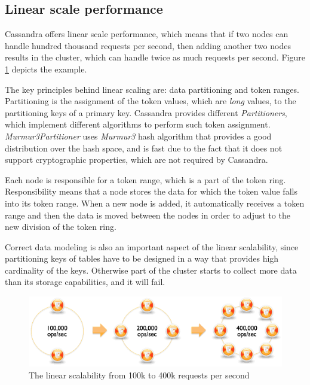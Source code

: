 
\subsection{Linear scale performance}
\label{sec:theory:cassandra:linear}
Cassandra offers linear scale performance, which means that if two nodes can handle hundred thousand requests per second, then adding another two nodes results in the cluster, which can handle twice as much requests per second. Figure \ref{fig:archLinearScale} depicts the example.

The key principles behind linear scaling are:  data partitioning and token ranges. 
Partitioning is the assignment of the token values, which are \emph{long} values, to the partitioning keys of a primary key. Cassandra provides different \emph{Partitioners}, which implement different algorithms to perform such token assignment. \emph{Murmur3Partitioner} uses \emph{Murmur3} hash algorithm that provides a good distribution over the hash space, and is fast due to the fact that it does not support cryptographic properties, which are not required by Cassandra.

Each node is responsible for a token range, which is a part of the token ring. Responsibility means that a node stores the data for which the token value falls into its token range. When a new node is added, it automatically receives a token range and then the data is moved between the nodes in order to adjust to the new division of the token ring.

Correct data modeling is also an important aspect of the linear scalability, since partitioning keys of tables have to be designed in a way that provides high cardinality of the keys. Otherwise part of the cluster starts to collect more data than its storage capabilities, and it will fail. 


\begin{figure}[H]
  \centering  
  \includegraphics[width=\textwidth]{images/cassandra-linear-scalability.png}\hspace{10mm}  
  \caption{The linear scalability from 100k to 400k requests per second}
  \label{fig:archLinearScale}
\end{figure}


